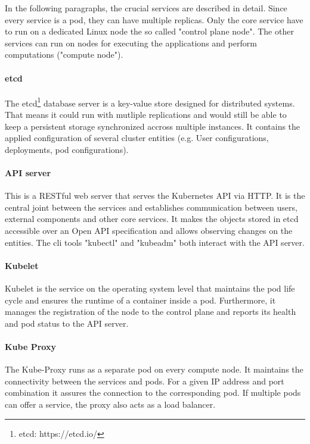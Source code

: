 In the following paragraphs, the crucial services are described in detail. Since every service is a pod, they can have multiple replicas. Only the core service have to run on a dedicated Linux node the so called "control plane node". The other services can run on nodes for executing the applications and perform computations ("compute node").

\paragraph{etcd}
The etcd\footnote{etcd: https://etcd.io/} database server is a key-value store designed for distributed systems\cite{Luksa.2018}. That means it could run with mutliple replications and would still be able to keep a persistent storage synchronized accross multiple instances. It contains the applied configuration of several cluster entities (e.g. User configurations, deployments, pod configurations).

\paragraph{API server}
This is a RESTful web server that serves the Kubernetes API via HTTP\cite{Kubernetes.20221024}. It is the central joint between the services and establishes communication between users, external components and other core services. It makes the objects stored in etcd accessible over an Open API specification\cite{Luksa.2018,OpenAPIInitiative.20230210} and allows observing changes on the entities. The \ac{cli} tools "kubectl" and "kubeadm" both interact with the API server.

\paragraph{Kubelet} Kubelet is the service on the operating system level that maintains the pod life cycle and ensures the runtime of a container inside a pod. Furthermore, it manages the registration of the node to the control plane and reports its health and pod status to the API server.

\paragraph{Kube Proxy} The Kube-Proxy runs as a separate pod on every compute node. It maintains the connectivity between the services and pods\cite{Luksa.2018}. For a given IP address and port combination it assures the connection to the corresponding pod. If multiple pods can offer a service, the proxy also acts as a load balancer\cite{Luksa.2018}.


